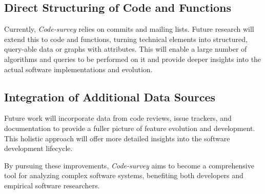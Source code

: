 \subsection{Direct Structuring of Code and Functions}

Currently, \emph{Code-survey} relies on commits and mailing lists. Future research will extend this to code and functions, turning technical elements into structured, query-able data or graphs with attributes. This will enable a large number of algorithms and queries to be performed on it and provide deeper insights into the actual software implementations and evolution.

\subsection{Integration of Additional Data Sources}

Future work will incorporate data from code reviews, issue trackers, and documentation to provide a fuller picture of feature evolution and development. This holistic approach will offer more detailed insights into the software development lifecycle.

By pursuing these improvements, \emph{Code-survey} aims to become a comprehensive tool for analyzing complex software systems, benefiting both developers and empirical software researchers.
